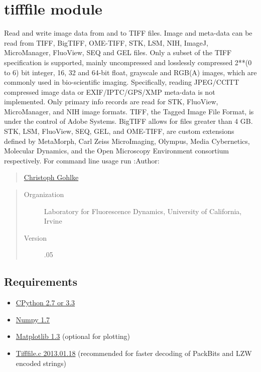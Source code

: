 \documentclass[letterpaper,10pt,english]{sphinxmanual}
\begin{document}
\chapter{tifffile module}
\label{tifffile:module-tifffile}\label{tifffile:tifffile-module}\label{tifffile::doc}
Read and write image data from and to TIFF files.
Image and meta-data can be read from TIFF, BigTIFF, OME-TIFF, STK, LSM, NIH,
ImageJ, MicroManager, FluoView, SEQ and GEL files.
Only a subset of the TIFF specification is supported, mainly uncompressed
and losslessly compressed 2**(0 to 6) bit integer, 16, 32 and 64-bit float,
grayscale and RGB(A) images, which are commonly used in bio-scientific imaging.
Specifically, reading JPEG/CCITT compressed image data or EXIF/IPTC/GPS/XMP
meta-data is not implemented. Only primary info records are read for STK,
FluoView, MicroManager, and NIH image formats.
TIFF, the Tagged Image File Format, is under the control of Adobe Systems.
BigTIFF allows for files greater than 4 GB. STK, LSM, FluoView, SEQ, GEL,
and OME-TIFF, are custom extensions defined by MetaMorph, Carl Zeiss
MicroImaging, Olympus, Media Cybernetics, Molecular Dynamics, and the Open
Microscopy Environment consortium respectively.
For command line usage run 
:Author:
\begin{quote}

\href{http://www.lfd.uci.edu/~gohlke/}{Christoph Gohlke}
\end{quote}
\begin{quote}\begin{description}
\item[{Organization}] \leavevmode
Laboratory for Fluorescence Dynamics, University of California, Irvine

\item[{Version}] .05

\end{description}\end{quote}


\section{Requirements}
\label{tifffile:requirements}\begin{itemize}
\item {} 
\href{http://www.python.org}{CPython 2.7 or 3.3}

\item {} 
\href{http://www.numpy.org}{Numpy 1.7}

\item {} 
\href{http://www.matplotlib.org}{Matplotlib 1.3}  (optional for plotting)

\item {} 
\href{http://www.lfd.uci.edu/~gohlke/}{Tifffile.c 2013.01.18}
(recommended for faster decoding of PackBits and LZW encoded strings)

\end{itemize}
\end{document}
